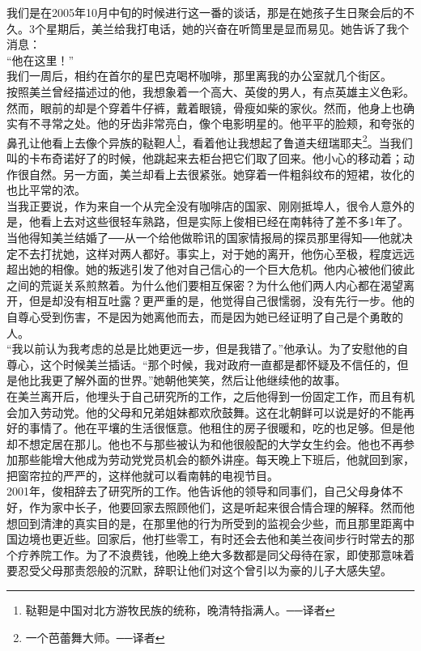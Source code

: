 我们是在2005年10月中旬的时候进行这一番的谈话，那是在她孩子生日聚会后的不久。3个星期后，美兰给我打电话，她的兴奋在听筒里是显而易见。她告诉了我个消息：\\

“他在这里！”\\

我们一周后，相约在首尔的星巴克喝杯咖啡，那里离我的办公室就几个街区。\\

按照美兰曾经描述过的他，我想象着一个高大、英俊的男人，有点英雄主义色彩。然而，眼前的却是个穿着牛仔裤，戴着眼镜，骨瘦如柴的家伙。然而，他身上也确实有不寻常之处。他的牙齿非常亮白，像个电影明星的。他平平的脸颊，和夸张的鼻孔让他看上去像个异族的鞑靼人\footnote{鞑靼是中国对北方游牧民族的统称，晚清特指满人。──译者}，看着他让我想起了鲁道夫纽瑞耶夫\footnote{一个芭蕾舞大师。──译者}。当我们叫的卡布奇诺好了的时候，他跳起来去柜台把它们取了回来。他小心的移动着；动作很自然。另一方面，美兰却看上去很紧张。她穿着一件粗斜纹布的短裙，妆化的也比平常的浓。\\

当我正要说，作为来自一个从完全没有咖啡店的国家、刚刚抵埠人，很令人意外的是，他看上去对这些很轻车熟路，但是实际上俊相已经在南韩待了差不多1年了。当他得知美兰结婚了──从一个给他做聆讯的国家情报局的探员那里得知──他就决定不去打扰她，这样对两人都好。事实上，对于她的离开，他伤心至极，程度远远超出她的相像。她的叛逃引发了他对自己信心的一个巨大危机。他内心被他们彼此之间的荒诞关系煎熬着。为什么他们要相互保密？为什么他们两人内心都在渴望离开，但是却没有相互吐露？更严重的是，他觉得自己很懦弱，没有先行一步。他的自尊心受到伤害，不是因为她离他而去，而是因为她已经证明了自己是个勇敢的人。\\

“我以前认为我考虑的总是比她更远一步，但是我错了。”他承认。为了安慰他的自尊心，这个时候美兰插话。“那个时候，我对政府一直都是都怀疑及不信任的，但是他比我更了解外面的世界。”她朝他笑笑，然后让他继续他的故事。\\

在美兰离开后，他埋头于自己研究所的工作，之后他得到一份固定工作，而且有机会加入劳动党。他的父母和兄弟姐妹都欢欣鼓舞。这在北朝鲜可以说是好的不能再好的事情了。他在平壤的生活很惬意。他租住的房子很暖和，吃的也足够。但是他却不想定居在那儿。他也不与那些被认为和他很般配的大学女生约会。他也不再参加那些能增大他成为劳动党党员机会的额外讲座。每天晚上下班后，他就回到家，把窗帘拉的严严的，这样他就可以看南韩的电视节目。\\

2001年，俊相辞去了研究所的工作。他告诉他的领导和同事们，自己父母身体不好，作为家中长子，他要回家去照顾他们，这是听起来很合情合理的解释。然而他想回到清津的真实目的是，在那里他的行为所受到的监视会少些，而且那里距离中国边境也更近些。回家后，他打些零工，有时还会去他和美兰夜间步行时常去的那个疗养院工作。为了不浪费钱，他晚上绝大多数都是同父母待在家，即使那意味着要忍受父母那责怨般的沉默，辞职让他们对这个曾引以为豪的儿子大感失望。\\

